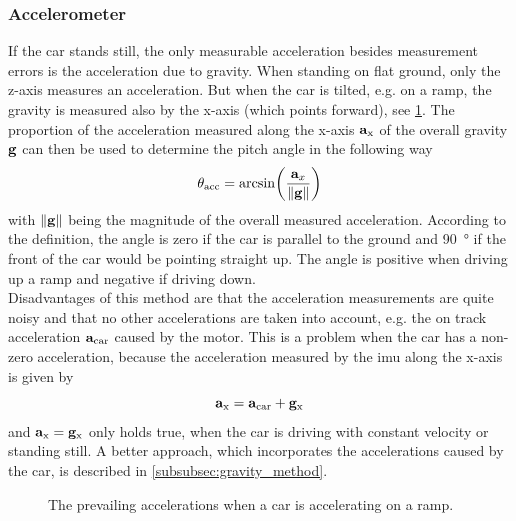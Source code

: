 \subsubsection{Accelerometer}
\label{ssec:linear_acceleration_only}
If the car stands still, the only measurable acceleration besides measurement errors is the acceleration due to gravity.
When standing on flat ground, only the z-axis measures an acceleration.
But when the car is tilted, e.g. on a ramp, the gravity is measured also by the x-axis (which points forward), see \cref{fig:tikz_car_gravity}.
The proportion of the acceleration measured along the x-axis $\vb{a}_\mathrm{x} $ of the overall gravity $\vb{g}$ can then be used to determine the pitch angle in the following way
\begin{equation}
	\label{eq:ang_from_acc}
	\theta_\mathrm{acc}  = \arcsin(\frac{\vb{a}_x}{\norm{\vb{g}}})
\end{equation}
with $\norm{\vb{g}}$ being the magnitude of the overall measured acceleration.
According to the definition, the angle is zero if the car is parallel to the ground and \SI{90}{\degree} if the front of the car would be pointing straight up.
The angle is positive when driving up a ramp and negative if driving down.\\
Disadvantages of this method are that the acceleration measurements are quite noisy and that no other accelerations are taken into account, e.g. the on track acceleration $\vb{a}_\mathrm{car}$ caused by the motor.
This is a problem when the car has a non-zero acceleration, because the acceleration measured by the \gls{imu} along the x-axis is given by
\begin{equation}
	\vb{a}_\mathrm{x} = \vb{a}_\mathrm{car} + \vb{g}_\mathrm{x}
\end{equation}
and $\vb{a}_\mathrm{x} = \vb{g}_\mathrm{x} $ only holds true, when the car is driving with constant velocity or standing still.
A better approach, which incorporates the accelerations caused by the car, is described in \cref{subsubsec:gravity_method}.
\begin{figure}[htpb]
	\centering
	
	\caption[Accelerations on a ramp]{The prevailing accelerations when a car is accelerating on a ramp.}
	\label{fig:tikz_car_gravity}
\end{figure}
